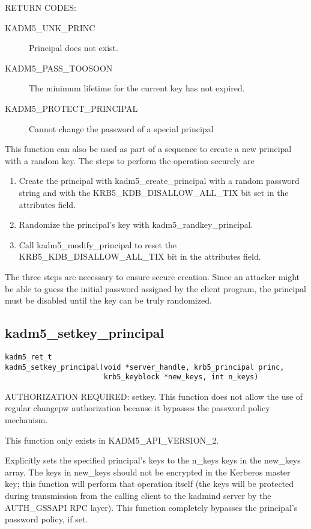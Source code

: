 RETURN CODES:

\begin{description}
\item[KADM5_UNK_PRINC] Principal does not exist.
\item[KADM5_PASS_TOOSOON] The minimum lifetime for the current
key has not expired.
\item[KADM5_PROTECT_PRINCIPAL] Cannot change the password of a special
principal
\end{description}

This function can also be used as part of a sequence to create a new
principal with a random key.  The steps to perform the operation
securely are

\begin{enumerate}
\item Create the principal with kadm5_create_principal with a
random password string and with the KRB5_KDB_DISALLOW_ALL_TIX bit set
in the attributes field.

\item Randomize the principal's key with kadm5_randkey_principal.

\item Call kadm5_modify_principal to reset the
KRB5_KDB_DISALLOW_ALL_TIX bit in the attributes field.
\end{enumerate}

The three steps are necessary to ensure secure creation.  Since an
attacker might be able to guess the initial password assigned by the
client program, the principal must be disabled until the key can be
truly randomized.

\subsection{kadm5_setkey_principal}

\begin{verbatim}
kadm5_ret_t
kadm5_setkey_principal(void *server_handle, krb5_principal princ,
                       krb5_keyblock *new_keys, int n_keys)
\end{verbatim}

AUTHORIZATION REQUIRED: setkey.  This function does not allow the use
of regular changepw authorization because it bypasses the password
policy mechanism.

This function only exists in KADM5_API_VERSION_2.

Explicitly sets the specified principal's keys to the n_keys keys in
the new_keys array.  The keys in new_keys should not be encrypted in
the Kerberos master key; this function will perform that operation
itself (the keys will be protected during transmission from the
calling client to the kadmind server by the AUTH_GSSAPI RPC layer).
This function completely bypasses the principal's password policy, if
set.

